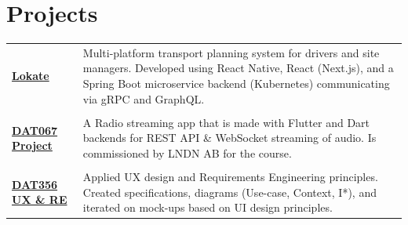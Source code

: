 \section{Projects}\label{sec:projects-&-course-projects}
\begin{tabular}{>{\footnotesize\bfseries} p{32pt} >{\footnotesize}p{}}
    \href{https://web.archive.org/web/20250613073516/lokate.io}{Lokate} &
    Multi-platform transport planning system for drivers and site managers.
    Developed using React Native, React (Next.js), and a Spring Boot microservice backend (Kubernetes) communicating via gRPC and GraphQL.
    \vspace{6px} \\ \\

    \href{https://www.student.chalmers.se/sp/course?course_id=34088}{DAT067 Project} &
    A Radio streaming app that is made with Flutter and Dart backends for REST API \& WebSocket streaming of audio.
    Is commissioned by LNDN AB for the course.
    \vspace{6px} \\ \\
    \href{https://www.student.chalmers.se/sp/course?course_id=33536}{DAT356 UX \& RE} &
    Applied UX design and Requirements Engineering principles.
    Created specifications, diagrams (Use-case, Context, I*), and iterated on mock-ups based on UI design principles.
\end{tabular}

